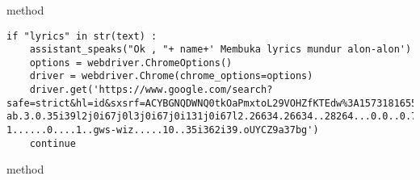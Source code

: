 \\
\\
\\
\\
\\
\\
\\
\\
\\
\\
\\
\\
\\
\\
\\
method 
\begin{lstlisting}
if "lyrics" in str(text) :
    assistant_speaks("Ok , "+ name+' Membuka lyrics mundur alon-alon')
    options = webdriver.ChromeOptions()
    driver = webdriver.Chrome(chrome_options=options)
    driver.get('https://www.google.com/search?safe=strict&hl=id&sxsrf=ACYBGNQDWNQ0tkOaPmxtoL29VOHZfKTEdw%3A1573181655017&source=hp&ei=1tjEXefEO4eEvQSLj4KwBQ&q=lirik+mundur+alon+alon&oq=l&gs_l=psy-ab.3.0.35i39l2j0i67j0l3j0i67j0i131j0i67l2.26634.26634..28264...0.0..0.705.875.0j1j6-1......0....1..gws-wiz.....10..35i362i39.oUYCZ9a37bg')
    continue
\end{lstlisting}
method
\\
\\
\\
\\
\\
\\
\\
\\
\\
\\
\\
\\
\\
\\
\\
\\
\\
\\
\\
\\
\\
\\
\\
\\
\\
\\
\\
\\
\\
\\
